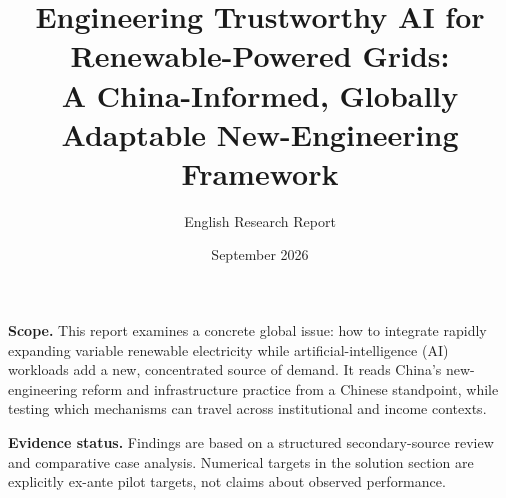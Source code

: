 \documentclass[12pt]{article}
\title{\vspace{-1.2cm}\textbf{Engineering Trustworthy AI for Renewable-Powered Grids:\\
A China-Informed, Globally Adaptable New-Engineering Framework}}
\author{English Research Report}
\date{September 2026}
\begin{document}
\begin{titlepage}
  \maketitle
  \thispagestyle{empty}
  \vfill
  \begin{center}
    \begin{minipage}{0.86\textwidth}
      \small\RaggedRight
      \textbf{Scope.} This report examines a concrete global issue: how to integrate rapidly expanding variable renewable electricity while artificial-intelligence (AI) workloads add a new, concentrated source of demand. It reads China's new-engineering reform and infrastructure practice from a Chinese standpoint, while testing which mechanisms can travel across institutional and income contexts.

      \vspace{0.5em}
      \textbf{Evidence status.} Findings are based on a structured secondary-source review and comparative case analysis. Numerical targets in the solution section are explicitly ex-ante pilot targets, not claims about observed performance.
    \end{minipage}
  \end{center}
  \vfill
\end{titlepage}
\end{document}

